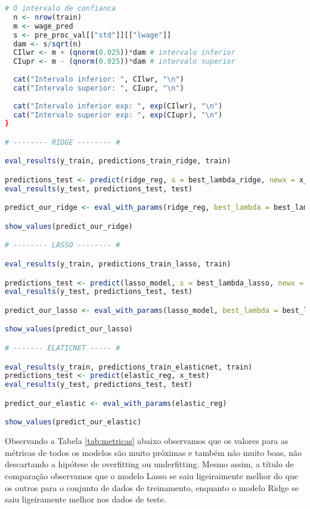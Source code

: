 \begin{lstlisting}[language=R, style=input]
  # O intervalo de confianca
  n <- nrow(train)
  m <- wage_pred
  s <- pre_proc_val[["std"]][["lwage"]]
  dam <- s/sqrt(n)
  CIlwr <- m + (qnorm(0.025))*dam # intervalo inferior
  CIupr <- m - (qnorm(0.025))*dam # intervalo superior
  
  cat("Intervalo inferior: ", CIlwr, "\n")
  cat("Intervalo superior: ", CIupr, "\n")
  
  cat("Intervalo inferior exp: ", exp(CIlwr), "\n")
  cat("Intervalo superior exp: ", exp(CIupr), "\n")
}

# -------- RIDGE -------- #

eval_results(y_train, predictions_train_ridge, train)

predictions_test <- predict(ridge_reg, s = best_lambda_ridge, newx = x_test)
eval_results(y_test, predictions_test, test)

predict_our_ridge <- eval_with_params(ridge_reg, best_lambda = best_lambda_ridge)

show_values(predict_our_ridge)

# -------- LASSO -------- #

eval_results(y_train, predictions_train_lasso, train)

predictions_test <- predict(lasso_model, s = best_lambda_lasso, newx = x_test)
eval_results(y_test, predictions_test, test)

predict_our_lasso <- eval_with_params(lasso_model, best_lambda = best_lambda_lasso)

show_values(predict_our_lasso)

# ------- ELATICNET ----- #

eval_results(y_train, predictions_train_elasticnet, train) 
predictions_test <- predict(elastic_reg, x_test)
eval_results(y_test, predictions_test, test)

predict_our_elastic <- eval_with_params(elastic_reg)

show_values(predict_our_elastic)
\end{lstlisting}

Observando a Tabela \ref{tab:metricas} abaixo observamos que os valores para as métricas de todos os modelos são muito próximas e também não muito boas, não descartando a hipótese de overfitting ou underfitting. Mesmo assim, a título de comparação observamos que o modelo Lasso se saiu ligeiraimente melhor do que os outros para o conjunto de dados de treinamento, enquanto o modelo Ridge se saiu ligeiramente melhor nos dados de teste.

